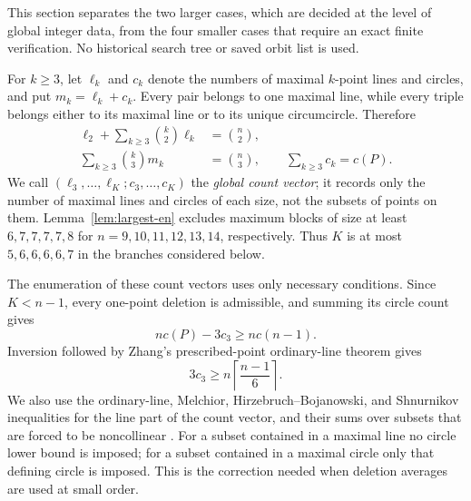 \documentclass[11pt,a4paper]{article}
\theoremstyle{definition}
\begin{document}
This section separates the two larger cases, which are decided at the level of
global integer data, from the four smaller cases that require an exact finite
verification.  No historical search tree or saved orbit list is used.

For $k\ge3$, let $\ell_k$ and $c_k$ denote the numbers of maximal $k$-point
lines and circles, and put $m_k=\ell_k+c_k$.
Every pair belongs to one maximal
line, while every triple belongs either to its maximal line or to its unique
circumcircle.  Therefore
\begin{align}
 \ell_2+\sum_{k\ge3}\binom{k}{2}\ell_k&=\binom n2,
 \label{eq:small-line-pairs-en}\\
 \sum_{k\ge3}\binom{k}{3}m_k&=\binom n3,
 \qquad \sum_{k\ge3}c_k=c(P).
 \label{eq:small-triple-partition-en}
\end{align}
We call $(\ell_3,\ldots,\ell_K;c_3,\ldots,c_K)$ the \emph{global count
vector}; it records only the number of maximal lines and circles of each size,
not the subsets of points on them.  Lemma~\ref{lem:largest-en} excludes maximum blocks of size at
least $6,7,7,7,7,8$ for $n=9,10,11,12,13,14$, respectively.  Thus $K$ is at
most $5,6,6,6,6,7$ in the branches considered below.

The enumeration of these count vectors uses only necessary conditions.  Since $K<n-1$,
every one-point deletion is admissible, and summing its circle count gives
\begin{equation}\label{eq:small-one-delete-en}
 n c(P)-3c_3\ge n c(n-1).
\end{equation}
Inversion followed by Zhang's prescribed-point ordinary-line theorem
\cite[Theorem~4.1]{zhang-en} gives
\begin{equation}\label{eq:small-z-circle-en}
 3c_3\ge n\left\lceil\frac{n-1}{6}\right\rceil.
\end{equation}
We also use the ordinary-line, Melchior, Hirzebruch--Bojanowski, and
Shnurnikov inequalities for the line part of the count vector, and their sums
over subsets that are forced to be noncollinear
\cite[Eq.~(9)]{hirzebruch-en}
\cite[Theorem~2.1]{pokora-en}\cite[Theorem~3]{shnurnikov-en}.
For a subset contained in a maximal line no circle lower bound is imposed; for
a subset contained in a maximal circle only that defining circle is imposed.
This is the correction needed when deletion averages are used at small order.
\end{document}
